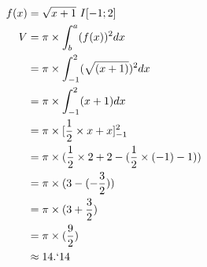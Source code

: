 \documentclass[11pt,a4paper]{report}
\begin{document}
	\begin{equation}
		\begin{split}	
			f(x) & = \sqrt{x + 1}\ I[-1;2] \\
			V & = \pi \times \int_{b}^{a} (f(x))^2 dx \\
			& = \pi \times \int_{-1}^{2} (\sqrt{(x+1)})^2 dx \\
			& = \pi \times \int_{-1}^{2} (x+1) dx \\
			& = \pi \times [\frac{1}{2}\times x + x]^2_{-1} \\
			& = \pi \times (\frac{1}{2} \times 2 + 2 - (\frac{1}{2} \times (-1) -1)) \\
			& = \pi \times (3 - (-\frac{3}{2})) \\
			& = \pi \times (3 + \frac{3}{2}) \\
			& = \pi \times (\frac{9}{2}) \\
			& \approx 14.`14
		\end{split}
	\end{equation}
\end{document}
